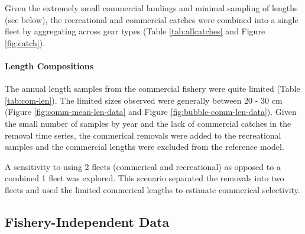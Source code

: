 \documentclass[11pt,
  english,
  a4paper,
]{article}
\begin{document}
\leavevmode\tagmcend\tagstructend\par


Given the extremely small commercial landings and minimal sampling of lengths (see below), the recreational and commercial catches were combined into a single fleet by aggregating across gear types (Table \ref{tab:allcatches} and Figure \ref{fig:catch}).

\leavevmode\tagmcend\tagstructend\par


\hypertarget{length-compositions-1}{%
\paragraph{Length Compositions}\label{length-compositions-1}}

\leavevmode\tagmcend\tagstructend


The annual length samples from the commercial fishery were quite limited (Table \ref{tab:com-len}). The limited sizes observed were generally between 20 - 30 cm (Figure \ref{fig:comm-mean-len-data} and Figure \ref{fig:bubble-comm-len-data}). Given the small number of samples by year and the lack of commercial catches in the removal time series, the commerical removals were added to the recreational samples and the commercial lengths were excluded from the reference model.

\leavevmode\tagmcend\tagstructend\par


A sensitivity to using 2 fleets (commerical and recreational) as opposed to a combined 1 fleet was explored. This scenario separated the removals into two fleets and used the limited commerical lengths to estimate commerical selectivity.

\leavevmode\tagmcend\tagstructend\par


\hypertarget{fishery-independent-data}{%
\subsection{Fishery-Independent Data}\label{fishery-independent-data}}
\end{document}
